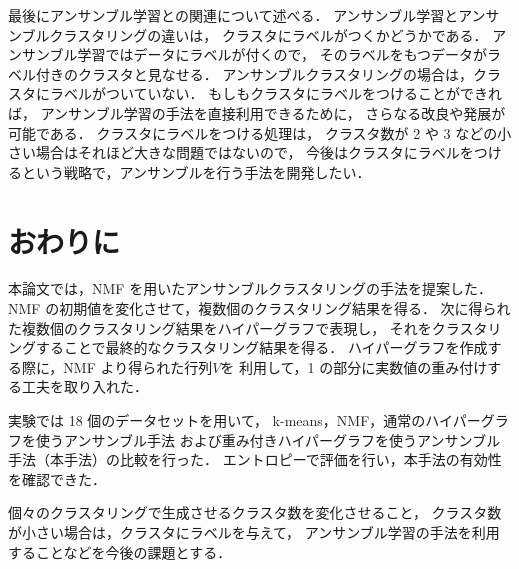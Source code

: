 \documentclass[japanese]{jnlp_1.3e}
\begin{document}
最後にアンサンブル学習\cite{breiman96bagging}との関連について述べる．
アンサンブル学習とアンサンブルクラスタリングの違いは，
クラスタにラベルがつくかどうかである．
アンサンブル学習ではデータにラベルが付くので，
そのラベルをもつデータがラベル付きのクラスタと見なせる．
アンサンブルクラスタリングの場合は，クラスタにラベルがついていない．
もしもクラスタにラベルをつけることができれば，
アンサンブル学習の手法を直接利用できるために，
さらなる改良や発展が可能である．
クラスタにラベルをつける処理は，
クラスタ数が 2 や 3 などの小さい場合はそれほど大きな問題ではないので，
今後はクラスタにラベルをつけるという戦略で，アンサンブルを行う手法を開発したい．


\section{おわりに}


本論文では，NMF を用いたアンサンブルクラスタリングの手法を提案した．
NMF の初期値を変化させて，複数個のクラスタリング結果を得る．
次に得られた複数個のクラスタリング結果をハイパーグラフで表現し，
それをクラスタリングすることで最終的なクラスタリング結果を得る．
ハイパーグラフを作成する際に，NMF より得られた行列\( V \)を
利用して，1 の部分に実数値の重み付けする工夫を取り入れた．

実験では 18 個のデータセットを用いて，
k-means，NMF，通常のハイパーグラフを使うアンサンブル手法
および重み付きハイパーグラフを使うアンサンブル手法（本手法）の比較を行った．
エントロピーで評価を行い，本手法の有効性を確認できた．

個々のクラスタリングで生成させるクラスタ数を変化させること，
クラスタ数が小さい場合は，クラスタにラベルを与えて，
アンサンブル学習の手法を利用することなどを今後の課題とする．
\end{document}
